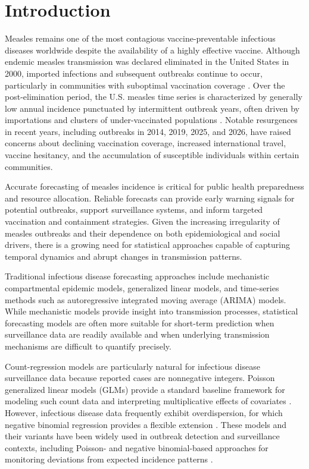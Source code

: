\documentclass[utf8]{FrontiersinHarvard} %
\begin{document}
\section{Introduction}
Measles remains one of the most contagious vaccine-preventable infectious diseases worldwide despite the availability of a highly effective vaccine. Although endemic measles transmission was declared eliminated in the United States in 2000, imported infections and subsequent outbreaks continue to occur, particularly in communities with suboptimal vaccination coverage \citep{cdc2002measles2000,fiebelkorn2010postelimination}. Over the post-elimination period, the U.S. measles time series is characterized by generally low annual incidence punctuated by intermittent outbreak years, often driven by importations and clusters of under-vaccinated populations \citep{cdc2002measles2000,fiebelkorn2010postelimination}. Notable resurgences in recent years, including outbreaks in 2014, 2019, 2025, and 2026, have raised concerns about declining vaccination coverage, increased international travel, vaccine hesitancy, and the accumulation of susceptible individuals within certain communities.

Accurate forecasting of measles incidence is critical for public health preparedness and resource allocation. Reliable forecasts can provide early warning signals for potential outbreaks, support surveillance systems, and inform targeted vaccination and containment strategies. Given the increasing irregularity of measles outbreaks and their dependence on both epidemiological and social drivers, there is a growing need for statistical approaches capable of capturing temporal dynamics and abrupt changes in transmission patterns.

Traditional infectious disease forecasting approaches include mechanistic compartmental epidemic models, generalized linear models, and time-series methods such as autoregressive integrated moving average (ARIMA) models. While mechanistic models provide insight into transmission processes, statistical forecasting models are often more suitable for short-term prediction when surveillance data are readily available and when underlying transmission mechanisms are difficult to quantify precisely.

Count-regression models are particularly natural for infectious disease surveillance data because reported cases are nonnegative integers. Poisson generalized linear models (GLMs) provide a standard baseline framework for modeling such count data and interpreting multiplicative effects of covariates \citep{mccullagh1989glm}. However, infectious disease data frequently exhibit overdispersion, for which negative binomial regression provides a flexible extension \citep{hilbe2011negative}. These models and their variants have been widely used in outbreak detection and surveillance contexts, including Poisson- and negative binomial-based approaches for monitoring deviations from expected incidence patterns \citep{farrington1996outbreak,held2005surveillance,liboschik2017tscount}.
\end{document}
